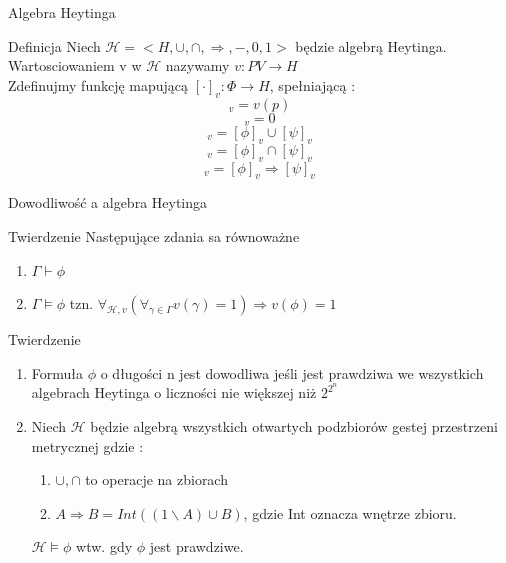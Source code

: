 \documentclass{beamer}
\begin{document}
\begin{frame}{Algebra Heytinga}
 \begin{block}{Definicja}
 Niech \( \mathcal{H} = < H, \cup, \cap, \Rightarrow, - , 0 ,1 >  \) będzie algebrą Heytinga.\\
  Wartosciowaniem v w \( \mathcal{H} \) nazywamy \( v : PV \rightarrow H\)\\
 Zdefinujmy funkcję mapującą  \( [ \cdot ]_v : \Phi \rightarrow H\), spełniającą :
 \begin{equation*}
 	[p]_v = v ( p)
 \end{equation*} 
 \begin{equation*}
 	[\bot]_v = 0
 \end{equation*} 
  \begin{equation*}
 	[\phi \vee \psi]_v = [\phi]_v \cup [\psi]_v
 \end{equation*}
  \begin{equation*}
 	[\phi \wedge \psi]_v = [\phi]_v \cap [\psi]_v 
 \end{equation*}
  \begin{equation*}
 	[\phi \rightarrow \psi]_v = [\phi]_v \Rightarrow [\psi]_v
 \end{equation*}
 \end{block}
\end{frame}

\begin{frame}{Dowodliwość a algebra Heytinga}
 \begin{block}{Twierdzenie}
Następujące zdania sa równoważne
	\begin{enumerate}
	\item \(\Gamma \vdash \phi\)
 	\item \(\Gamma \models \phi\) tzn. \( \forall_{\mathcal{H}, v} ( \forall_{\gamma \in \Gamma} v(\gamma) = 1 ) \Rightarrow v(\phi)  = 1\)

	\end{enumerate}
 \end{block}
 
 \begin{block}{Twierdzenie}
	\begin{enumerate}
	\item Formuła \(\phi\) o długości n jest dowodliwa jeśli jest prawdziwa we wszystkich algebrach Heytinga o liczności nie większej niż \( 2 ^ {2 ^ n}\)
 	\item Niech \(\mathcal{H}\) będzie algebrą wszystkich otwartych podzbiorów gestej przestrzeni metrycznej gdzie : \\
 	\begin{enumerate}
 	\item \( \cup, \cap\) to operacje na zbiorach
 	\item \( A \Rightarrow B  = Int ( (1 \backslash A) \cup B) \), gdzie Int oznacza wnętrze zbioru.
 	\end{enumerate}
 	\( \mathcal{H} \models \phi\) wtw. gdy \(\phi\) jest prawdziwe. 

	\end{enumerate}
 \end{block}
\end{frame}
\end{document}
